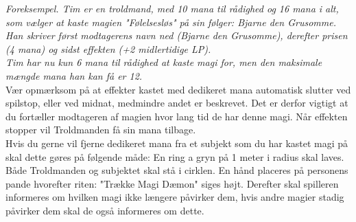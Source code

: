 \textit{Foreksempel. Tim er en troldmand, med 10 mana til rådighed og 16 mana i alt, som vælger at kaste magien "Følelsesløs" på sin følger: Bjarne den Grusomme. Han skriver først modtagerens navn ned (Bjarne den Grusomme), derefter prisen (4 mana) og sidst effekten (+2 midlertidige LP).\\
Tim har nu kun 6 mana til rådighed at kaste magi for, men den maksimale mængde mana han kan få er 12.}\\

Vær opmærksom på at effekter kastet med dedikeret mana automatisk slutter ved spilstop, eller ved midnat, medmindre andet er beskrevet. Det er derfor vigtigt at du fortæller modtageren af magien hvor lang tid de har denne magi. Når effekten stopper vil Troldmanden få sin mana tilbage.\\
Hvis du gerne vil fjerne dedikeret mana fra et subjekt som du har kastet magi på skal dette gøres på følgende måde: En ring a gryn på 1 meter i radius skal laves. Både Troldmanden og subjektet skal stå i cirklen. En hånd placeres på personens pande hvorefter riten: "Trække Magi Dæmon" siges højt.
Derefter skal spilleren informeres om hvilken magi ikke længere påvirker dem, hvis andre magier stadig påvirker dem skal de også informeres om dette. 





